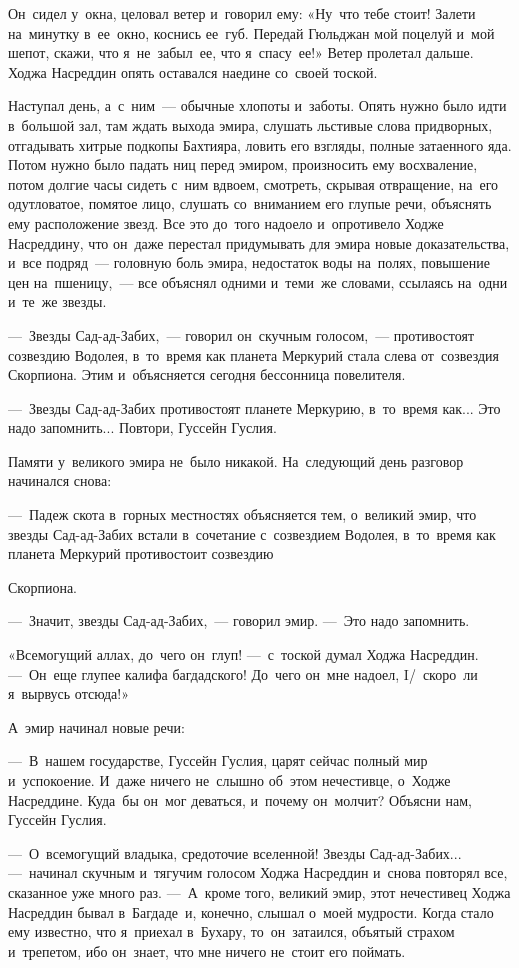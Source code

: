 \documentclass[12pt,a4paper]{book}
\begin{document}
Он~сидел у~окна, целовал ветер и~говорил ему: «Ну~что тебе стоит! Залети на~минутку в~ее~окно, коснись ее~губ. Передай Гюльджан мой поцелуй и~мой шепот, скажи, что я~не~забыл~ее, что я~спасу~ее!» Ветер пролетал дальше. Ходжа Насреддин опять оставался наедине со~своей тоской.

Наступал день, а~с~ним~— обычные хлопоты и~заботы. Опять нужно было идти в~большой зал, там ждать выхода эмира, слушать льстивые слова придворных, отгадывать хитрые подкопы Бахтияра, ловить его взгляды, полные затаенного яда. Потом нужно было падать ниц перед эмиром, произносить ему восхваление, потом долгие часы сидеть с~ним вдвоем, смотреть, скрывая отвращение, на~его одутловатое, помятое лицо, слушать со~вниманием его глупые речи, объяснять ему расположение звезд. Все это до~того надоело и~опротивело Ходже Насреддину, что он~даже перестал придумывать для эмира новые доказательства, и~все подряд~— головную боль эмира, недостаток воды на~полях, повышение цен на~пшеницу,~— все объяснял одними и~теми~же словами, ссылаясь на~одни и~те~же звезды.

—~Звезды Сад-ад-Забих,~— говорил он~скучным голосом,~— противостоят созвездию Водолея, в~то~время как планета Меркурий стала слева от~созвездия Скорпиона. Этим и~объясняется сегодня бессонница повелителя.

—~Звезды Сад-ад-Забих противостоят планете Меркурию, в~то~время как... Это надо запомнить... Повтори, Гуссейн Гуслия.

Памяти у~великого эмира не~было никакой. На~следующий день разговор начинался снова:

—~Падеж скота в~горных местностях объясняется тем, о~великий эмир, что звезды Сад-ад-Забих встали в~сочетание с~созвездием Водолея, в~то~время как планета Меркурий противостоит созвездию

Скорпиона.

—~Значит, звезды Сад-ад-Забих,~— говорил эмир. —~Это надо запомнить.

«Всемогущий аллах, до~чего он~глуп! —~с~тоской думал Ходжа Насреддин. —~Он~еще глупее калифа багдадского! До~чего он~мне надоел, I/~скоро~ли я~вырвусь отсюда!»

А~эмир начинал новые речи:

—~В~нашем государстве, Гуссейн Гуслия, царят сейчас полный мир и~успокоение. И~даже ничего не~слышно об~этом нечестивце, о~Ходже Насреддине. Куда~бы он~мог деваться, и~почему он~молчит? Объясни нам, Гуссейн Гуслия.

—~О~всемогущий владыка, средоточие вселенной! Звезды Сад-ад-Забих... —~начинал скучным и~тягучим голосом Ходжа Насреддин и~снова повторял все, сказанное уже много раз. —~А~кроме того, великий эмир, этот нечестивец Ходжа Насреддин бывал в~Багдаде~и, конечно, слышал о~моей мудрости. Когда стало ему известно, что я~приехал в~Бухару, то~он~затаился, объятый страхом и~трепетом, ибо он~знает, что мне ничего не~стоит его поймать.
\end{document}
